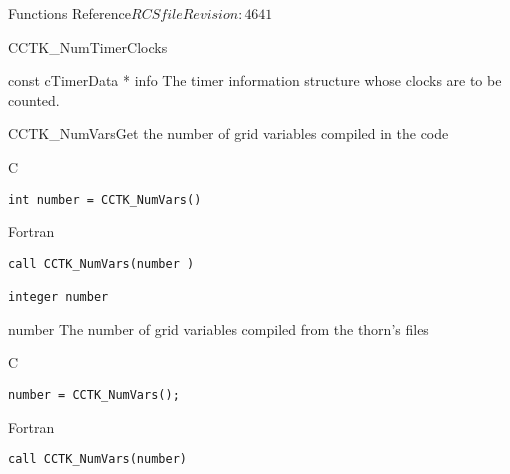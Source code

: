 \begin{cactuspart}{ Functions Reference}{$RCSfile$}{$Revision: 4641 $}
\begin{FunctionDescription}{CCTK\_NumTimerClocks}
\begin{ParameterSection}
\begin{Parameter} {const cTimerData * info}
The timer information structure whose clocks are to be counted.
\end{Parameter}
\end{ParameterSection}
\end{FunctionDescription}


\begin{FunctionDescription}{CCTK\_NumVars}{Get the number of grid variables compiled in the code}
\label{CCTK-NumVars}
\begin{SynopsisSection}
\begin{Synopsis}{C}
\begin{verbatim}int number = CCTK_NumVars()\end{verbatim}
\end{Synopsis}
\begin{Synopsis}{Fortran}
\begin{verbatim}call CCTK_NumVars(number )

integer number\end{verbatim}
\end{Synopsis}
\end{SynopsisSection}
\begin{ParameterSection}
\begin{Parameter}{number}
The number of grid variables compiled from the thorn's  files
\end{Parameter}
\end{ParameterSection}

\begin{ExampleSection}
\begin{Example}{C}
\begin{verbatim}
number = CCTK_NumVars();
\end{verbatim}
\end{Example}
\begin{Example}{Fortran}
\begin{verbatim}
call CCTK_NumVars(number)
\end{verbatim}
\end{Example}
\end{ExampleSection}
\end{FunctionDescription}





\end{cactuspart}

